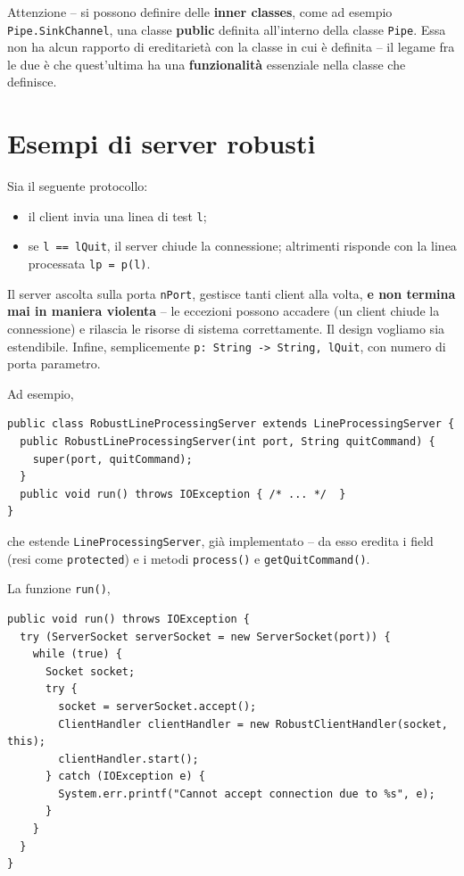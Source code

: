 \documentclass[\fontsizeclass,twocolumn]{\classname}
\theoremstyle{definition}
\theoremstyle{definition}
\begin{document}
Attenzione -- si possono definire delle \textbf{inner classes}, come ad esempio
\texttt{Pipe.SinkChannel}, una classe \textbf{public} definita all'interno
della classe \texttt{Pipe}. Essa non ha alcun rapporto di ereditarietà con la
classe in cui è definita -- il legame fra le due è che quest'ultima ha una
\textbf{funzionalità} essenziale nella classe che definisce.

\section{Esempi di server robusti}

Sia il seguente protocollo:
\begin{itemize}
    \item il client invia una linea di test \texttt{l};
    \item se \texttt{l == lQuit}, il server chiude la connessione; altrimenti
        risponde con la linea processata \texttt{lp = p(l)}.
\end{itemize}

Il server ascolta sulla porta \texttt{nPort}, gestisce tanti client alla volta,
\textbf{e non termina mai in maniera violenta} -- le eccezioni possono accadere
(un client chiude la connessione) e rilascia le risorse di sistema
correttamente. Il design vogliamo sia estendibile. Infine, semplicemente
\texttt{p: String -> String, lQuit}, con numero di porta parametro.

Ad esempio,

\begin{lstlisting}
public class RobustLineProcessingServer extends LineProcessingServer {
  public RobustLineProcessingServer(int port, String quitCommand) {
    super(port, quitCommand);
  }
  public void run() throws IOException { /* ... */  }
}
\end{lstlisting}

che estende \texttt{LineProcessing\-Server}, già implementato -- da esso eredita
i field (resi come \texttt{protected}) e i metodi \texttt{process()} e
\texttt{getQuitCommand()}.

La funzione \texttt{run()},

\begin{lstlisting}
public void run() throws IOException {
  try (ServerSocket serverSocket = new ServerSocket(port)) {
    while (true) {
      Socket socket;
      try {
        socket = serverSocket.accept();
        ClientHandler clientHandler = new RobustClientHandler(socket, this);
        clientHandler.start();
      } catch (IOException e) {
        System.err.printf("Cannot accept connection due to %s", e);
      }
    }
  }
}
\end{lstlisting}
\end{document}
